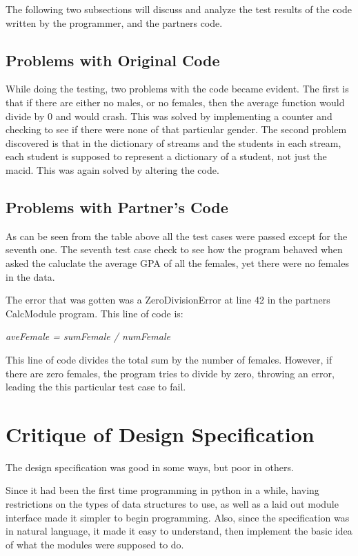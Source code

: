 \documentclass[12pt]{article}
\begin{document}
The following two subsections will discuss and analyze the test results of the code
written by the programmer, and the partners code.

\subsection{Problems with Original Code}

While doing the testing, two problems with the code became evident. The first is that
if there are either no males, or no females, then the average function would divide by 0
and would crash. This was solved by implementing a counter and checking to see if there were
none of that particular gender. The second problem discovered is that in the dictionary of streams
and the students in each stream, each student is supposed to represent a dictionary of a student,
not just the macid. This was again solved by altering the code.

\subsection{Problems with Partner's Code}

As can be seen from the table above all the test cases were passed except for the 
seventh one. The seventh test case check to see how the program behaved when
asked the caluclate the average GPA of all the females, yet there were no females
in the data.

The error that was gotten was a ZeroDivisionError at line 42 in the partners
CalcModule program. This line of code is:

\centerline{\textit{aveFemale = sumFemale / numFemale}}

This line of code divides the total sum by the number of females. However, if there
are zero females, the program tries to divide by zero, throwing an error, leading
the this particular test case to fail.

\section{Critique of Design Specification}

The design specification was good in some ways, but poor in others. 

Since it had been the first time programming in python in a while, having restrictions 
on the types of data structures to use, as well as a laid out module interface made it 
simpler to begin programming. Also, since the specification was in natural language, 
it made it easy to understand, then implement the basic idea of what the modules were 
supposed to do.
\end{document}
